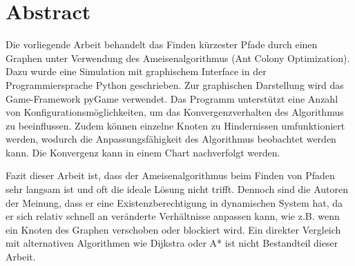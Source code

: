 

\chapter*{Abstract}

Die vorliegende Arbeit behandelt das Finden kürzester Pfade durch einen Graphen unter Verwendung des Ameisenalgorithmus (Ant Colony Optimization). Dazu wurde eine Simulation mit graphischem Interface in der Programmiersprache Python geschrieben. Zur graphischen Darstellung wird das Game-Framework pyGame verwendet. Das Programm unterstützt eine Anzahl von Konfigurationsmöglichkeiten, um das Konvergenzverhalten des Algorithmus zu beeinflussen. Zudem können einzelne Knoten zu Hindernissen umfunktioniert werden, wodurch die Anpassungsfähigkeit des Algorithmus beobachtet werden kann. Die Konvergenz kann in einem Chart nachverfolgt werden. 

Fazit dieser Arbeit ist, dass der Ameisenalgorithmus beim Finden von Pfaden sehr langsam ist und oft die ideale Lösung nicht trifft. Dennoch sind die Autoren der Meinung, dass er eine Existenzberechtigung in dynamischen System hat, da er sich relativ schnell an veränderte Verhältnisse anpassen kann, wie z.B. wenn ein Knoten des Graphen verschoben oder blockiert wird. Ein direkter Vergleich mit alternativen Algorithmen wie Dijkstra oder A* ist nicht Bestandteil dieser Arbeit.